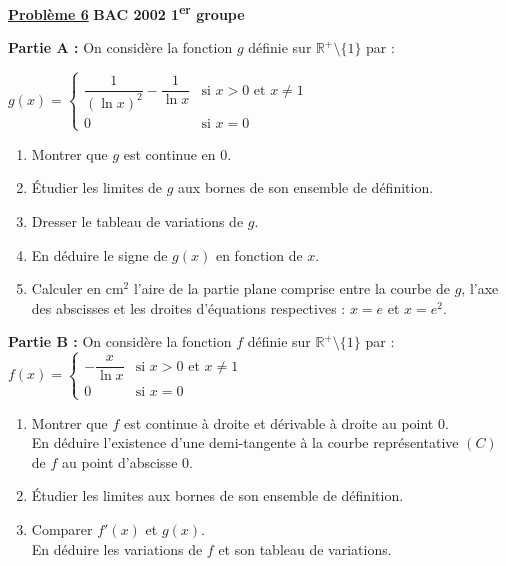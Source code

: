 \documentclass[12pt,a4paper]{article}
\newcommand{\exo}[1]{%
        \textbf{\underline{Problème #1}}
}
\begin{document}
\begin{multicols}{2}
\begin{enumerate}
\end{enumerate}


\exo{6} \textbf{BAC 2002 1\textsuperscript{er} groupe}

\textbf{Partie A :} On considère la fonction \( g \) définie sur \( \mathbb{R}^+ \setminus \{1\} \) par :

\(
g(x) =
\begin{cases}
\dfrac{1}{(\ln x)^2} - \dfrac{1}{\ln x} & \text{si } x > 0 \text{ et } x \neq 1 \\
0 & \text{si } x = 0
\end{cases}
\)

\begin{enumerate}
    \item Montrer que \( g \) est continue en 0.
    \item Étudier les limites de \( g \) aux bornes de son ensemble de définition.
    \item Dresser le tableau de variations de \( g \).
    \item En déduire le signe de \( g(x) \) en fonction de \( x \).
    \item Calculer en \( \text{cm}^2 \) l’aire de la partie plane comprise entre la courbe de \( g \), l’axe des abscisses et les droites d’équations respectives : \( x = e \) et \( x = e^2 \).
\end{enumerate}

\textbf{Partie B :} On considère la fonction \( f \) définie sur \( \mathbb{R}^+ \setminus \{1\} \) par :
\(
f(x) =
\begin{cases}
-\dfrac{x}{\ln x} & \text{si } x > 0 \text{ et } x \neq 1 \\
0 & \text{si } x = 0
\end{cases}
\)

\begin{enumerate}
    \item Montrer que \( f \) est continue à droite et dérivable à droite au point 0.\\
    En déduire l’existence d’une demi-tangente à la courbe représentative \( (C) \) de \( f \) au point d’abscisse 0.

    \item Étudier les limites aux bornes de son ensemble de définition.

    \item Comparer \( f'(x) \) et \( g(x) \).\\
    En déduire les variations de \( f \) et son tableau de variations.


\end{enumerate}
\end{multicols}
\end{document}
